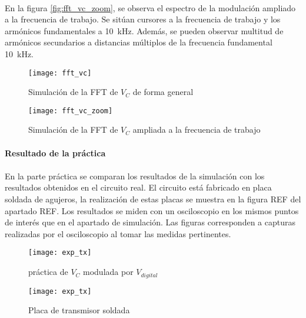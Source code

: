 \paragraph{}
En la figura \ref{fig:fft_vc_zoom}, se observa el espectro de la modulación ampliado a la frecuencia de trabajo. Se sitúan cursores a la frecuencia de trabajo y los armónicos fundamentales a \SI{10}{\kilo\hertz}. Además, se pueden observar multitud de armónicos secundarios a distancias múltiplos de la frecuencia fundamental \SI{10}{\kilo\hertz}.
\begin{figure}[h!]
    \centering
    \texttt{[image: fft\_vc]}
    \caption{Simulaci\'on de la FFT de $V_C$ de forma general}
    \label{fig:sim_fft}
\end{figure}
\begin{figure}[h!]
    \centering
    \texttt{[image: fft\_vc\_zoom]}
    \caption{Simulaci\'on de la FFT de $V_C$ ampliada a la frecuencia de trabajo}
    \label{fig:sim_fft_zoom}
\end{figure}

\paragraph{Resultado de la pr\'actica} %
\paragraph{}
En la parte práctica se comparan los resultados de la simulación con los resultados obtenidos en el circuito real. El circuito está fabricado en placa soldada de agujeros, la realizaci\'on de estas placas se muestra en la figura REF del apartado REF. Los resultados se miden con un osciloscopio en los mismos puntos de interés que en el apartado de simulación. Las figuras corresponden a capturas realizadas por el osciloscopio al tomar las medidas pertinentes.

\begin{figure}[h!]
    \centering
    \texttt{[image: exp\_tx]}
    \caption{práctica de $V_C$ modulada por $V_{digital}$}
    \label{fig:exp_vc_vdig}
\end{figure}

\begin{figure}[h!]
    \centering
    \texttt{[image: exp\_tx]}
    \caption{Placa de transmisor soldada}
    \label{fig:exp_placa_tx}
\end{figure}

